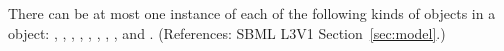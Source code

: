 There can be at most one instance of each of the following kinds of objects
in a \Model object: {\ListOfFunctionDefinitions,
\ListOfUnitDefinitions, \ListOfCompartments, \ListOfSpecies,
\ListOfParameters, \ListOfInitialAssignments, \ListOfRules,
\ListOfConstraints, \ListOfReactions} and
{\ListOfEvents}. (References: SBML L3V1
Section~\ref{sec:model}.)
